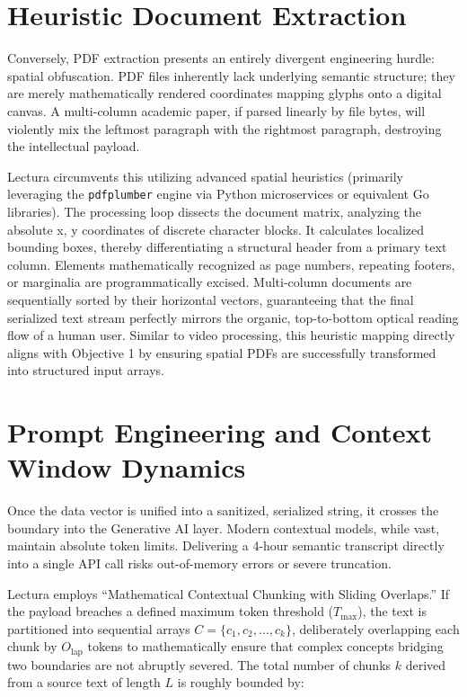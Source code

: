 \section{Heuristic Document Extraction}
Conversely, PDF extraction presents an entirely divergent engineering hurdle: spatial obfuscation. PDF files inherently lack underlying semantic structure; they are merely mathematically rendered coordinates mapping glyphs onto a digital canvas. A multi-column academic paper, if parsed linearly by file bytes, will violently mix the leftmost paragraph with the rightmost paragraph, destroying the intellectual payload.

Lectura circumvents this utilizing advanced spatial heuristics (primarily leveraging the \texttt{pdfplumber} engine via Python microservices or equivalent Go libraries). The processing loop dissects the document matrix, analyzing the absolute x, y coordinates of discrete character blocks. It calculates localized bounding boxes, thereby differentiating a structural header from a primary text column. Elements mathematically recognized as page numbers, repeating footers, or marginalia are programmatically excised. Multi-column documents are sequentially sorted by their horizontal vectors, guaranteeing that the final serialized text stream perfectly mirrors the organic, top-to-bottom optical reading flow of a human user. Similar to video processing, this heuristic mapping directly aligns with Objective 1 by ensuring spatial PDFs are successfully transformed into structured input arrays.

\section{Prompt Engineering and Context Window Dynamics}
Once the data vector is unified into a sanitized, serialized string, it crosses the boundary into the Generative AI layer. Modern contextual models, while vast, maintain absolute token limits. Delivering a 4-hour semantic transcript directly into a single API call risks out-of-memory errors or severe truncation.

Lectura employs ``Mathematical Contextual Chunking with Sliding Overlaps.'' If the payload breaches a defined maximum token threshold ($T_{\max}$), the text is partitioned into sequential arrays $C = \{c_1, c_2, \dots, c_k\}$, deliberately overlapping each chunk by $O_{\text{lap}}$ tokens to mathematically ensure that complex concepts bridging two boundaries are not abruptly severed. The total number of chunks $k$ derived from a source text of length $L$ is roughly bounded by:


